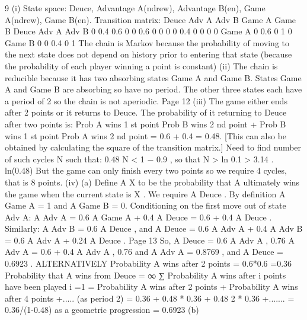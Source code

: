 \documentclass[a4paper,12pt]{article}
\begin{document}
\newpage
9
(i)
State space:
{Deuce, Advantage A(ndrew), Advantage B(en),
Game A(ndrew), Game B(en)}.
Transition matrix:
Deuce
Adv A
Adv B
Game A
Game B
Deuce Adv A Adv B
0
0.4
0.6
0
0 0.6
0
0
0
0 0.4
0
0
0
0
Game
A
0
0.6
0
1
0
Game
B
0
0
0.4
0
1
The chain is Markov because the probability of moving to the next state does not depend on history prior to entering that state (because the probability of
each player winning a point is constant)
(ii)
The chain is reducible because it has two absorbing states Game A and
Game B.
States Game A and Game B are absorbing so have no period. The other three
states each have a period of 2 so the chain is not aperiodic.
Page 12%
(iii)
The game either ends after 2 points or it returns to Deuce.
The probability of it returning to Deuce after two points is:
Prob A wins 1 st point \times  Prob B wins 2 nd point
+ Prob B wins 1 st point \times  Prob A wins 2 nd point
= 0.6  + 0.4  = 0.48.
[This can also be obtained by calculating the square of the transition matrix.]
Need to find number of such cycles N such that:
0.48 N < 1 − 0.9 ,
so that
N >
ln 0.1
> 3.14 .
ln(0.48)
But the game can only finish every two points so we require 4 cycles, that is 8
points.
(iv)
(a)
Define A X to be the probability that A ultimately wins the game when
the current state is X .
We require A Deuce .
By definition A Game A = 1 and A Game B = 0.
Conditioning on the first move out of state Adv A:
A Adv A = 0.6 \times  A Game A + 0.4 \times  A Deuce = 0.6 + 0.4 \times  A Deuce .
Similarly:
A Adv B = 0.6 \times  A Deuce ,
and
A Deuce = 0.6 \times  A Adv A + 0.4 \times  A Adv B = 0.6 \times  A Adv A + 0.24 \times  A Deuce .
Page 13%
So,
A Deuce =
0.6
A Adv A ,
0.76
A Adv A = 0.6 + 0.4 
A Adv A ,
0.76
and
A Adv A = 0.8769 ,
and
A Deuce = 0.6923 .
ALTERNATIVELY
Probability A wins after 2 points = 0.6*0.6 =0.36
Probability that A wins from Deuce
=
∞
∑
Probability A wins after i points have been played
i =1
= Probability A wins after 2 points
+ Probability A wins after 4 points +.....
(as period 2)
= 0.36 + 0.48 * 0.36 + 0.48 2 * 0.36 +.......
= 0.36/(1-0.48) as a geometric progression
= 0.6923
(b)
\end{document}
